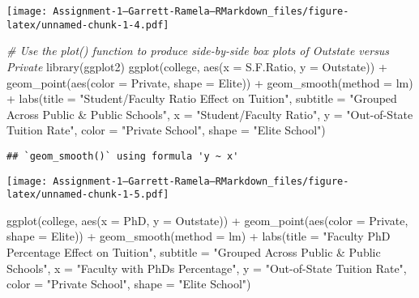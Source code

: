 \documentclass[
]{article}
\newenvironment{Shaded}{\begin{snugshade}}{\end{snugshade}}
\newcommand{\AttributeTok}[1]{\textcolor[rgb]{0.77,0.63,0.00}{#1}}
\newcommand{\CommentTok}[1]{\textcolor[rgb]{0.56,0.35,0.01}{\textit{#1}}}
\newcommand{\FunctionTok}[1]{\textcolor[rgb]{0.00,0.00,0.00}{#1}}
\newcommand{\NormalTok}[1]{#1}
\newcommand{\SpecialCharTok}[1]{\textcolor[rgb]{0.00,0.00,0.00}{#1}}
\newcommand{\StringTok}[1]{\textcolor[rgb]{0.31,0.60,0.02}{#1}}
\begin{document}
\texttt{[image: Assignment-1---Garrett-Ramela---RMarkdown\_files/figure-latex/unnamed-chunk-1-4.pdf]}

\begin{Shaded}
\begin{Highlighting}[]
\CommentTok{\# Use the plot() function to produce side{-}by{-}side box plots of Outstate versus Private}
\FunctionTok{library}\NormalTok{(ggplot2)}
\FunctionTok{ggplot}\NormalTok{(college, }\FunctionTok{aes}\NormalTok{(}\AttributeTok{x =}\NormalTok{ S.F.Ratio, }\AttributeTok{y =}\NormalTok{ Outstate)) }\SpecialCharTok{+}
  \FunctionTok{geom\_point}\NormalTok{(}\FunctionTok{aes}\NormalTok{(}\AttributeTok{color =}\NormalTok{ Private, }\AttributeTok{shape =}\NormalTok{ Elite)) }\SpecialCharTok{+}
  \FunctionTok{geom\_smooth}\NormalTok{(}\AttributeTok{method =}\NormalTok{ lm) }\SpecialCharTok{+}
  \FunctionTok{labs}\NormalTok{(}\AttributeTok{title =} \StringTok{"Student/Faculty Ratio Effect on Tuition"}\NormalTok{,}
       \AttributeTok{subtitle =} \StringTok{"Grouped Across Public \& Public Schools"}\NormalTok{,}
       \AttributeTok{x =} \StringTok{"Student/Faculty Ratio"}\NormalTok{,}
       \AttributeTok{y =} \StringTok{"Out{-}of{-}State Tuition Rate"}\NormalTok{,}
       \AttributeTok{color =} \StringTok{"Private School"}\NormalTok{,}
       \AttributeTok{shape =} \StringTok{"Elite School"}\NormalTok{)}
\end{Highlighting}
\end{Shaded}

\begin{verbatim}
## `geom_smooth()` using formula 'y ~ x'
\end{verbatim}

\texttt{[image: Assignment-1---Garrett-Ramela---RMarkdown\_files/figure-latex/unnamed-chunk-1-5.pdf]}

\begin{Shaded}
\begin{Highlighting}[]
\FunctionTok{ggplot}\NormalTok{(college, }\FunctionTok{aes}\NormalTok{(}\AttributeTok{x =}\NormalTok{ PhD, }\AttributeTok{y =}\NormalTok{ Outstate)) }\SpecialCharTok{+}
  \FunctionTok{geom\_point}\NormalTok{(}\FunctionTok{aes}\NormalTok{(}\AttributeTok{color =}\NormalTok{ Private, }\AttributeTok{shape =}\NormalTok{ Elite)) }\SpecialCharTok{+}
  \FunctionTok{geom\_smooth}\NormalTok{(}\AttributeTok{method =}\NormalTok{ lm) }\SpecialCharTok{+}
  \FunctionTok{labs}\NormalTok{(}\AttributeTok{title =} \StringTok{"Faculty PhD Percentage Effect on Tuition"}\NormalTok{,}
       \AttributeTok{subtitle =} \StringTok{"Grouped Across Public \& Public Schools"}\NormalTok{,}
       \AttributeTok{x =} \StringTok{"Faculty with PhDs Percentage"}\NormalTok{,}
       \AttributeTok{y =} \StringTok{"Out{-}of{-}State Tuition Rate"}\NormalTok{,}
       \AttributeTok{color =} \StringTok{"Private School"}\NormalTok{,}
       \AttributeTok{shape =} \StringTok{"Elite School"}\NormalTok{)}
\end{Highlighting}
\end{Shaded}
\end{document}
